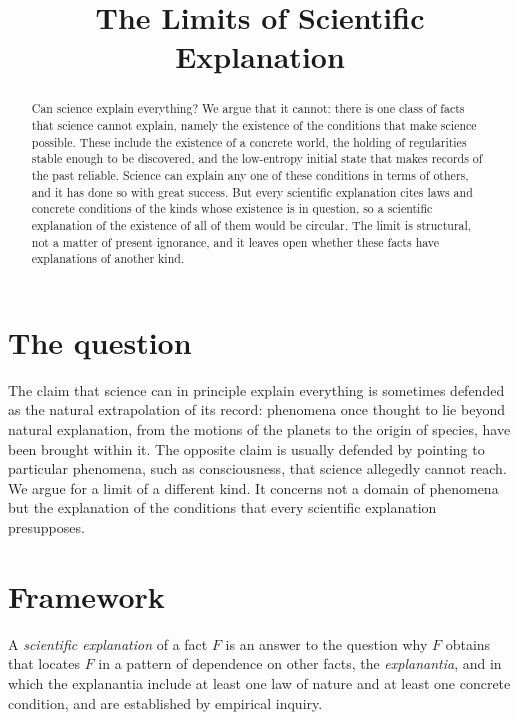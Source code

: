 \documentclass{situationist-preprint}
\title{The Limits of Scientific Explanation}
\begin{document}
\maketitle

\begin{abstract}
Can science explain everything? We argue that it cannot: there is one class of facts that science cannot explain, namely the existence of the conditions that make science possible. These include the existence of a concrete world, the holding of regularities stable enough to be discovered, and the low-entropy initial state that makes records of the past reliable. Science can explain any one of these conditions in terms of others, and it has done so with great success. But every scientific explanation cites laws and concrete conditions of the kinds whose existence is in question, so a scientific explanation of the existence of all of them would be circular. The limit is structural, not a matter of present ignorance, and it leaves open whether these facts have explanations of another kind.
\end{abstract}

\section{The question}

The claim that science can in principle explain everything is sometimes defended as the natural extrapolation of its record: phenomena once thought to lie beyond natural explanation, from the motions of the planets to the origin of species, have been brought within it. The opposite claim is usually defended by pointing to particular phenomena, such as consciousness, that science allegedly cannot reach. We argue for a limit of a different kind. It concerns not a domain of phenomena but the explanation of the conditions that every scientific explanation presupposes.

\section{Framework}

\begin{definition}\label{d:explanation}
A \emph{scientific explanation} of a fact $F$ is an answer to the question why $F$ obtains that locates $F$ in a pattern of dependence on other facts, the \emph{explanantia}, and in which the explanantia include at least one law of nature and at least one concrete condition, and are established by empirical inquiry.
\end{definition}
\end{document}
